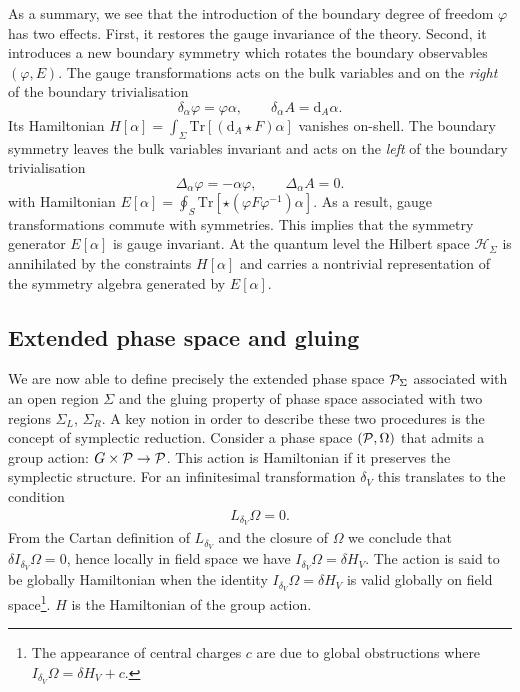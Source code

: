 \documentclass[a4paper,11pt]{article}
\newcommand{\be}{\begin{equation}}
\newcommand{\ee}{\end{equation}}
\newcommand{\beq}{\begin{eqnarray}}
\newcommand{\eeq}{\end{eqnarray}}
\def\rd{\mathrm{d}}
\newcommand{\Tr}{\mbox{Tr}}
\begin{document}
As a summary, we see that the introduction of the boundary degree of freedom $\varphi$ has two effects. 
First, it restores the gauge invariance of the theory.
Second, it introduces a new  boundary symmetry which rotates the boundary observables $(\varphi, E)$.
The gauge transformations acts on the bulk variables and on the {\it right} of the boundary trivialisation 
\begin{equation} 
\delta_\alpha \varphi = \varphi \alpha, \qquad
\delta_\alpha A = \rd_A \alpha.
\end{equation}
Its Hamiltonian $H[\alpha]=\int_\Sigma \Tr[(\rd_A\star F)\alpha]$ vanishes on-shell.
The boundary symmetry leaves the bulk variables invariant and acts on the {\it left} of the boundary trivialisation
\be 
\Delta_\alpha \varphi = - \alpha \varphi,\qquad \Delta_\alpha A=0.
\ee 
with Hamiltonian $E[\alpha]=\oint_S \Tr[  \star (\varphi F \varphi^{-1}) \alpha]$. 
As a result, gauge transformations commute with symmetries. 
This implies that the symmetry generator $E[\alpha]$ is gauge invariant.
At the quantum level the Hilbert space $\mathcal{H}_\Sigma$ is annihilated by the constraints $H[\alpha]$ and carries a nontrivial representation of the  symmetry algebra generated by $E[\alpha]$.

\subsection{Extended phase space and gluing} 
\label{subsection:ym-gluing}

We are now able to define precisely the extended phase space ${\cal P}_\Sigma$ associated with an open region $\Sigma$ and the gluing property of phase space associated with  two regions $\Sigma_L$, $\Sigma_R$.
A key notion in order to describe these two procedures is the concept of symplectic reduction. 
Consider a phase space ${({\cal P},\Omega)}$ that admits a group action: $G\times {\cal P} \to {\cal P}$.
This action is  Hamiltonian if it preserves the symplectic structure.
For an infinitesimal transformation $\delta_V$ this translates to the condition
\beq
L_{\delta_V} \Omega =0.
\eeq
From the Cartan definition of $L_{\delta_V}$ and the closure of $\Omega$ we conclude that $\delta I_{\delta_V}\Omega =0$, hence locally in field space we have $I_{\delta_V}\Omega = \delta H_V$. 
The action is said to be globally Hamiltonian when the identity $I_{\delta_V}\Omega = \delta H_V$ is valid globally on field space\footnote{The appearance of central charges $c$ are due to global obstructions where $ I_{\delta_V} \Omega =\delta H_V + c $. }. 
$H$ is the Hamiltonian of the group action.
\end{document}
